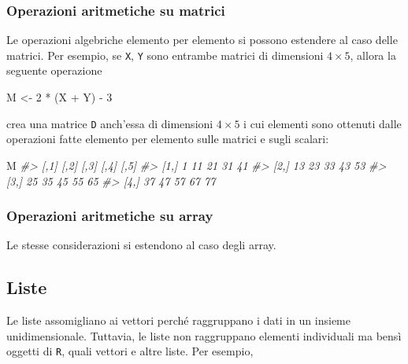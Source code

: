 \documentclass[
]{memoir}
\newenvironment{Shaded}{\begin{snugshade}}{\end{snugshade}}
\newcommand{\CommentTok}[1]{\textcolor[rgb]{0.56,0.35,0.01}{\textit{#1}}}
\newcommand{\DecValTok}[1]{\textcolor[rgb]{0.00,0.00,0.81}{#1}}
\newcommand{\NormalTok}[1]{#1}
\newcommand{\OtherTok}[1]{\textcolor[rgb]{0.56,0.35,0.01}{#1}}
\newcommand{\SpecialCharTok}[1]{\textcolor[rgb]{0.00,0.00,0.00}{#1}}
\theoremstyle{definition}
\theoremstyle{definition}
\theoremstyle{definition}
\theoremstyle{definition}
\theoremstyle{remark}
\begin{document}
\hypertarget{operazioni-aritmetiche-su-matrici}{%
\subsubsection{Operazioni aritmetiche su matrici}\label{operazioni-aritmetiche-su-matrici}}

Le operazioni algebriche elemento per elemento si possono estendere al
caso delle matrici. Per esempio, se \texttt{X}, \texttt{Y} sono entrambe matrici di
dimensioni \(4 \times 5\), allora la seguente operazione

\begin{Shaded}
\begin{Highlighting}[]
\NormalTok{M }\OtherTok{\textless{}{-}} \DecValTok{2} \SpecialCharTok{*}\NormalTok{ (X }\SpecialCharTok{+}\NormalTok{ Y) }\SpecialCharTok{{-}} \DecValTok{3}
\end{Highlighting}
\end{Shaded}

crea una matrice \texttt{D} anch'essa di dimensioni \(4 \times 5\) i cui elementi
sono ottenuti dalle operazioni fatte elemento per elemento sulle matrici
e sugli scalari:

\begin{Shaded}
\begin{Highlighting}[]
\NormalTok{M}
\CommentTok{\#\textgreater{}      [,1] [,2] [,3] [,4] [,5]}
\CommentTok{\#\textgreater{} [1,]    1   11   21   31   41}
\CommentTok{\#\textgreater{} [2,]   13   23   33   43   53}
\CommentTok{\#\textgreater{} [3,]   25   35   45   55   65}
\CommentTok{\#\textgreater{} [4,]   37   47   57   67   77}
\end{Highlighting}
\end{Shaded}

\hypertarget{operazioni-aritmetiche-su-array}{%
\subsubsection{Operazioni aritmetiche su array}\label{operazioni-aritmetiche-su-array}}

Le stesse considerazioni si estendono al caso degli array.

\hypertarget{liste}{%
\subsection{Liste}\label{liste}}

Le liste assomigliano ai vettori perché raggruppano i dati in un insieme
unidimensionale. Tuttavia, le liste non raggruppano elementi individuali
ma bensì oggetti di \texttt{R}, quali vettori e altre liste. Per esempio,
\end{document}
